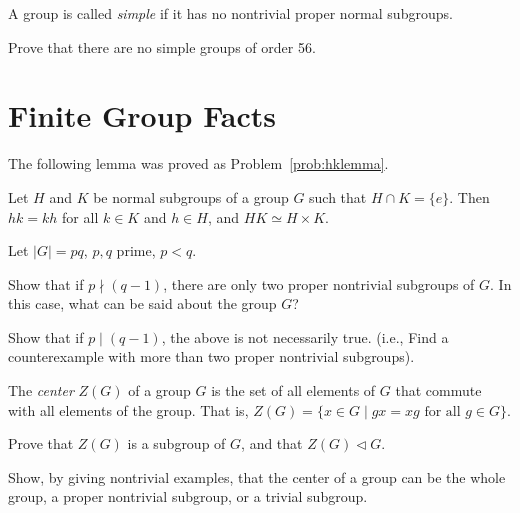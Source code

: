 \begin{definition}
 A group is called \emph{simple} if it has no nontrivial proper normal subgroups.
\end{definition}

\begin{problem}
Prove that there are no simple groups of order 56.
\end{problem}

\section{Finite Group Facts}

The following lemma was proved as Problem~\ref{prob:hklemma}.

\begin{lemma}
 Let $H$ and $K$ be normal subgroups of a group $G$ such that $H\cap K = \{e\}$. Then $hk = kh$ for all $k\in K$ and $h\in H$, and $HK \simeq H\times K$.
\end{lemma}

\begin{problem}
Let $\lvert G \rvert = pq$, $p,q$ prime, $p<q$.
\begin{problemparts}
 \item Show that if $p \nmid (q-1)$, there are only two proper nontrivial subgroups of $G$.  In this case, what can be said about the group $G$?
 \item Show that if $p \mid (q-1)$, the above is not necessarily true. (i.e., Find a counterexample with more than two proper nontrivial subgroups).
\end{problemparts}
\end{problem}

\begin{definition}
 The \emph{center} $Z(G)$ of a group $G$ is the set of all elements of $G$ that commute with all elements of the group.  That is, $Z(G) = \{ x \in G \mid gx = xg \mbox{ for all } g \in G \}$.
\end{definition}

\begin{problem}
Prove that $Z(G)$ is a subgroup of $G$, and that $Z(G)\lhd G$.
\end{problem}

\begin{problem}
Show, by giving nontrivial examples, that the center of a group can be the whole group, a proper nontrivial subgroup, or a trivial subgroup.
\begin{annotation}
\end{annotation}
\end{problem}

